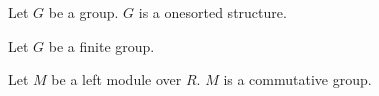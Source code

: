 
\begin{classification}
\label{notion_group_is_onesorted}
    Let $G$ be a group.
    $G$ is a onesorted structure.
\end{classification}

Let $G$ be a finite group.

\begin{classification}
\label{notion_module_is_commutative_group}
    Let $M$ be a left module over $R$.
    $M$ is a commutative group.
\end{classification}
